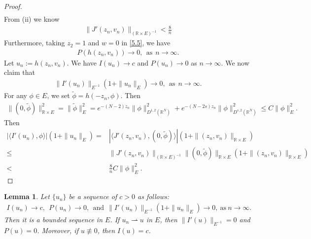 \documentclass[12pt,a4paper,reqno]{amsart}
\numberwithin{equation}{section}
\newtheorem{lemma}{Lemma}[section]
\begin{document}
\begin{proof}
\begin{equation*}
\begin{aligned}
\end{aligned}
\end{equation*}
From (ii) we know
\begin{equation*}
\begin{aligned}
\|J'(z_{n},v_{n})\|_{(\mathbb{R}\times E)^{-1}}< \frac{8}{n}
\end{aligned}
\end{equation*}
Furthermore, taking $z_{2}=1$ and $w=0$ in \eqref{5.5}, we have
\begin{equation*}
\begin{aligned}
P(h(z_{n},v_{n}))\to 0, ~~\mathrm{as}~~n\to\infty.
\end{aligned}
\end{equation*}
Let $u_{n}:=h(z_{n},v_{n})$.
We have $I(u_{n})\to c$ and $P(u_{n})\to 0$ as $n\to \infty$. We now claim that
\begin{equation*}
\begin{aligned}
\|I'(u_{n})\|_{E^{-1}}(1+\|u_{n}\|_{E})\to 0,~~\mathrm{as}~~n\to\infty.
\end{aligned}
\end{equation*}
For any $\phi\in E$, we set $\tilde{\phi}=h(-z_{n},\phi)$. Then
\begin{equation*}
\begin{aligned}
\|(0,\tilde{\phi})\|_{\mathbb{R}\times E}^{2}
=\|\tilde{\phi}\|_{E}^{2}
=e^{-(N-2)z_{n}}\|\phi\|^{2}_{D^{1,2}(\mathbb{R}^{N})}
+e^{-(N-2s)z_{n}}\|\phi\|^{2}_{D^{s,2}(\mathbb{R}^{N})}
\leqslant C\|\phi\|_{E}^{2}.
\end{aligned}
\end{equation*}
Then
\begin{equation*}
\begin{aligned}
|
\langle
I'(u_{n}),\phi
\rangle
|
(1+\|u_{n}\|_{E})
=&
|
\langle
J'(z_{n},v_{n}),(0,\tilde{\phi})
\rangle
|
(1+\|(z_{n},v_{n})\|_{\mathbb{R}\times E})\\
\leqslant&
\|J'(z_{n},v_{n})\|_{(\mathbb{R}\times E)^{-1}}
\|(0,\tilde{\phi})\|_{\mathbb{R}\times E}
(1+\|(z_{n},v_{n})\|_{\mathbb{R}\times E})\\
<&\frac{8}{n}C\|\phi\|_{E}^{2}.
\end{aligned}
\end{equation*}

\end{proof}

\begin{lemma}\label{Lemma5.8}
Let $\{u_{n}\}$
be a sequence of
$c>0$ as follows:
\begin{equation*}
\begin{aligned}
I(u_{n})\to c,~~
P(u_{n})\to 0,~~\mathrm{and}~~ \|I'(u_{n})\|_{E^{-1}}(1+\|u_{n}\|_{E})\to 0,\ \mathrm{as}\ n\rightarrow \infty.
\end{aligned}
\end{equation*}
Then it is a bounded sequence in $E$.
If
$u_{n}\rightharpoonup u$
in
$E$,
then
$\|I'(u)\|_{E^{-1}}=0$ and $P(u)=0$. Moreover, if $u\not\equiv0$, then $I(u)=c$.
\end{lemma}
\end{document}
